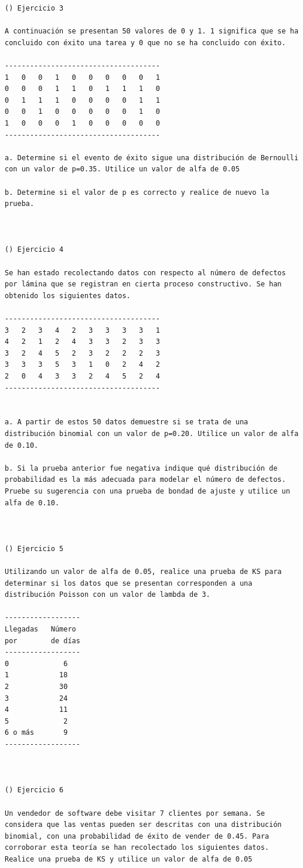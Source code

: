 \begin{verbatim}
() Ejercicio 3

A continuación se presentan 50 valores de 0 y 1. 1 significa que se ha concluido con éxito una tarea y 0 que no se ha concluido con éxito.

-------------------------------------
1   0   0   1   0   0   0   0   0   1
0   0   0   1   1   0   1   1   1   0
0   1   1   1   0   0   0   0   1   1
0   0   1   0   0   0   0   0   1   0
1   0   0   0   1   0   0   0   0   0
-------------------------------------

a. Determine si el evento de éxito sigue una distribución de Bernoulli con un valor de p=0.35. Utilice un valor de alfa de 0.05

b. Determine si el valor de p es correcto y realice de nuevo la prueba.



() Ejercicio 4

Se han estado recolectando datos con respecto al número de defectos por lámina que se registran en cierta proceso constructivo. Se han obtenido los siguientes datos.

-------------------------------------
3   2   3   4   2   3   3   3   3   1
4   2   1   2   4   3   3   2   3   3
3   2   4   5   2   3   2   2   2   3
3   3   3   5   3   1   0   2   4   2
2   0   4   3   3   2   4   5   2   4
-------------------------------------


a. A partir de estos 50 datos demuestre si se trata de una distribución binomial con un valor de p=0.20. Utilice un valor de alfa de 0.10.

b. Si la prueba anterior fue negativa indique qué distribución de probabilidad es la más adecuada para modelar el número de defectos. Pruebe su sugerencia con una prueba de bondad de ajuste y utilice un alfa de 0.10.



() Ejercicio 5

Utilizando un valor de alfa de 0.05, realice una prueba de KS para determinar si los datos que se presentan corresponden a una distribución Poisson con un valor de lambda de 3.

------------------
Llegadas   Número
por        de días
------------------
0             6
1            18
2            30
3            24
4            11
5             2
6 o más       9
------------------



() Ejercicio 6

Un vendedor de software debe visitar 7 clientes por semana. Se considera que las ventas pueden ser descritas con una distribución binomial, con una probabilidad de éxito de vender de 0.45. Para corroborar esta teoría se han recolectado los siguientes datos. Realice una prueba de KS y utilice un valor de alfa de 0.05


\end{verbatim}
